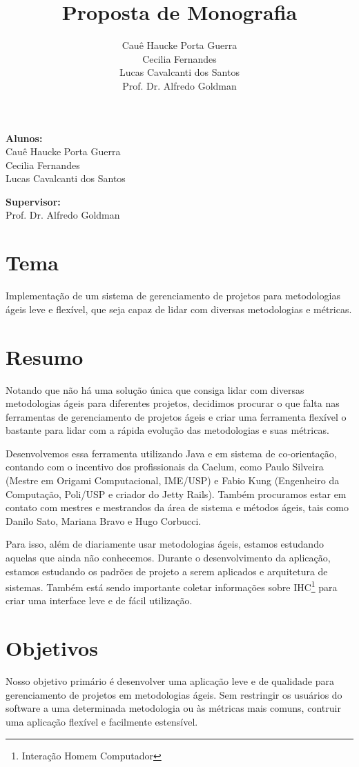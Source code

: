 \documentclass[titlepage]{article}
\title{Proposta de Monografia}
\author{Cauê Haucke Porta Guerra\\Cecilia Fernandes\\Lucas Cavalcanti dos Santos\\Prof. Dr. Alfredo Goldman}
\begin{document}
\maketitle

\begin{description} 
\item{\textbf{Alunos:}\\Cauê Haucke Porta Guerra\\Cecilia Fernandes\\Lucas Cavalcanti dos Santos}
\item{\textbf{Supervisor:}\\Prof. Dr. Alfredo Goldman}
\end{description}

\section{Tema}
Implementação de um sistema de gerenciamento de projetos para metodologias ágeis leve e flexível, que seja capaz de lidar com diversas metodologias e métricas.


\section{Resumo}
Notando que não há uma solução única que consiga lidar com diversas metodologias ágeis para diferentes projetos, decidimos procurar o que falta nas ferramentas de gerenciamento de projetos ágeis e criar uma ferramenta flexível o bastante para lidar com a rápida evolução das metodologias e suas métricas.

Desenvolvemos essa ferramenta utilizando Java e em sistema de co-orientação, contando com o incentivo dos profissionais da Caelum, como Paulo Silveira (Mestre em Origami Computacional, IME/USP) e Fabio Kung (Engenheiro da Computação, Poli/USP e criador do Jetty Rails). Também procuramos estar em contato com mestres e mestrandos da área de sistema e métodos ágeis, tais como Danilo Sato, Mariana Bravo e Hugo Corbucci.

Para isso, além de diariamente usar metodologias ágeis, estamos estudando aquelas que ainda não conhecemos. Durante o desenvolvimento da aplicação, estamos estudando os padrões de projeto a serem aplicados e arquitetura de sistemas. Também está sendo importante coletar informações sobre IHC\footnote{Interação Homem Computador} para criar uma interface leve e de fácil utilização.

\section{Objetivos}
Nosso objetivo primário é desenvolver uma aplicação leve e de qualidade para gerenciamento de projetos em metodologias ágeis. Sem restringir os usuários do software a uma determinada metodologia ou às métricas mais comuns, contruir uma aplicação flexível e facilmente estensível.
\end{document}
